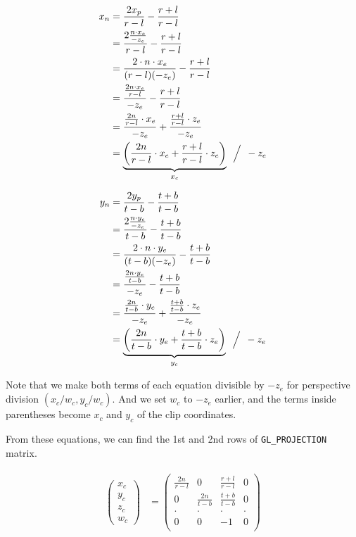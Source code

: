 \begin{equation}
\begin{aligned}
x_n& = \frac{2x_p}{r-l} - \frac{r+l}{r-l}\\
   &=\frac{2 \frac{n \cdot x_e}{-z_e} }{r-l} - \frac{r+l}{r-l}\\
   &=\frac{2 \cdot n \cdot x_e}{(r-l)(-z_e)} - \frac{r+l}{r-l}\\
   &=\frac{ \frac{2n\cdot x_e}{r-l} }{-z_e}  - \frac{r+l}{r-l}\\
   &=\frac{ \frac{2n}{r-l} \cdot x_e }{-z_e} + \frac{ \frac{r+l}{r-l} \cdot z_e}{-z_e}\\
   &=\underbrace{\left( \frac{2n}{r-l} \cdot x_e + \frac{r+l}{r-l}\cdot z_e\right)}_{x_c} \left.\frac{}{}\left/\frac{}{}\right.\right.-z_e
\end{aligned}
\end{equation}

\begin{equation}
\begin{aligned}
y_n& = \frac{2y_p}{t-b} - \frac{t+b}{t-b}\\
   &=\frac{2 \frac{n \cdot y_e}{-z_e} }{t-b} - \frac{t+b}{t-b}\\
   &=\frac{2 \cdot n \cdot y_e}{(t-b)(-z_e)} - \frac{t+b}{t-b}\\
   &=\frac{ \frac{2n\cdot y_e}{t-b} }{-z_e}  - \frac{t+b}{t-b}\\
   &=\frac{ \frac{2n}{t-b} \cdot y_e }{-z_e} + \frac{ \frac{t+b}{t-b} \cdot z_e}{-z_e}\\
   &=\underbrace{\left( \frac{2n}{t-b} \cdot y_e + \frac{t+b}{t-b}\cdot z_e\right)}_{y_c} \left.\frac{}{}\left/\frac{}{}\right.\right.-z_e
\end{aligned}
\end{equation}

Note that we make both terms of each equation divisible by $-z_e$ for perspective division $(x_c/w_c, y_c/w_c)$. And we set $w_c$ to $-z_e$ earlier, and the terms inside parentheses become $x_c$ and $y_c$ of the clip coordinates.

From these equations, we can find the 1st and 2nd rows of \verb|GL_PROJECTION| matrix. 

\begin{equation}
\begin{aligned}
\begin{split}
\begin{pmatrix} x_{c}\\y_{c}\\z_{c}\\w_{c} \end{pmatrix} &= 
\begin{pmatrix} 
\frac{2n}{r-l} & 0 & \frac{r+l}{r-l} & 0 \\
0 & \frac{2n}{t-b} & \frac{t+b}{t-b} & 0 \\
\cdot & \cdot & \cdot & \cdot \\
0 & 0 & -1 & 0 \\
\end{pmatrix}
\end{split}
\end{aligned}
\end{equation}


